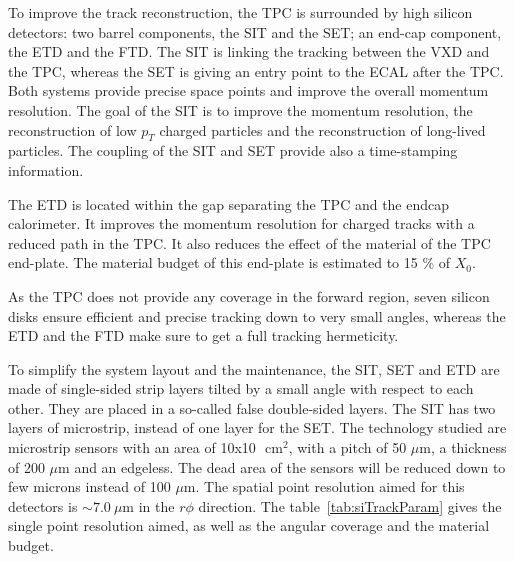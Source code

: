       To improve the track reconstruction, the \gls{TPC} is surrounded by high silicon detectors: two barrel components, the \gls{SIT} and the \gls{SET}; an end-cap component, the \gls{ETD} and the \gls{FTD}.
      The \gls{SIT} is linking the tracking between the \gls{VXD} and the \gls{TPC}, whereas the \gls{SET} is giving an entry point to the \gls{ECAL} after the \gls{TPC}.
      Both systems provide precise space points and improve the overall momentum resolution.
      The goal of the \gls{SIT} is to improve the momentum resolution, the reconstruction of low $p_{T}$ charged particles and the reconstruction of long-lived particles.
      The coupling of the \gls{SIT} and \gls{SET} provide also a time-stamping information.

      The \gls{ETD} is located within the gap separating the \gls{TPC} and the endcap calorimeter. 
      It improves the momentum resolution for charged tracks with a reduced path in the \gls{TPC}.
      It also reduces the effect of the material of the \gls{TPC} end-plate. 
      The material budget of this end-plate is estimated to 15 \% of $X_0$.

      As the \gls{TPC} does not provide any coverage in the forward region, seven silicon disks ensure efficient and precise tracking down to very small angles, whereas the \gls{ETD} and the \gls{FTD} make sure to get a full tracking hermeticity.

      To simplify the system layout and the maintenance, the \gls{SIT}, \gls{SET} and \gls{ETD} are made of single-sided strip layers tilted by a small angle with respect to each other. 
      They are placed in a so-called false double-sided layers.
      The \gls{SIT} has two layers of microstrip, instead of one layer for the \gls{SET}. 
      The technology studied are microstrip sensors with an area of 10x10 $\text{ cm}^2$, with a pitch of 50 $\mu$m, a thickness of 200 $\mu$m and an edgeless.
      The dead area of the sensors will be reduced down to few microns instead of 100 $\mu$m.
      The spatial point resolution aimed for this detectors is $\sim 7.0 \ \mu$m in the $r\phi$ direction.
      The table~\ref{tab:siTrackParam} gives the single point resolution aimed, as well as the angular coverage and the material budget.


